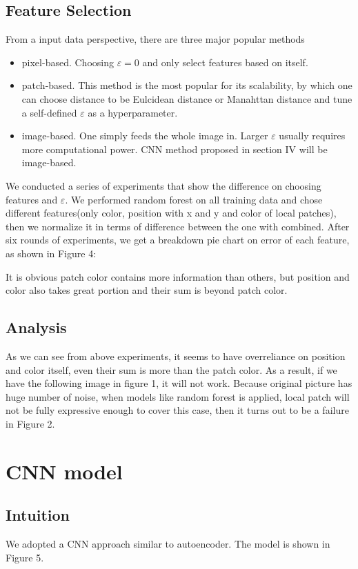 \documentclass[conference]{IEEEtran}
\begin{document}
\subsection{Feature Selection}
From a input data perspective, there are three major popular methods
\begin{itemize}
\item pixel-based. Choosing $\varepsilon = 0$ and only select features based on itself.
\item patch-based. This method is the most popular for its scalability, by which one can choose distance to be Eulcidean distance or Manahttan distance and tune a self-defined $\varepsilon$ as a hyperparameter. 
\item image-based. One simply feeds the whole image in. Larger $\varepsilon$ usually requires more computational power. CNN method proposed in section IV will be image-based.
\end{itemize}
We conducted a series of experiments that show the difference on choosing features and $\varepsilon$. We performed random forest on all training data and chose different features(only color, position with x and y and color of local patches), then we normalize it in terms of difference between the one with combined. After six rounds of experiments, we get a breakdown pie chart on error of each feature, as shown in Figure 4:


It is obvious patch color contains more information than others, but position and color also takes great portion and their sum is beyond patch color. 

\subsection{Analysis}
As we can see from above experiments, it seems to have overreliance on position and color itself, even their sum is more than the patch color. As a result, if we have the following image in figure 1, it will not work.
Because original picture has huge number of noise, when models like random forest is applied, local patch will not be fully expressive enough to cover this case, then it turns out to be a failure in Figure 2.

\section{CNN model}
\subsection*{Intuition}
We adopted a CNN approach similar to autoencoder. The model is shown in Figure 5.
\end{document}
